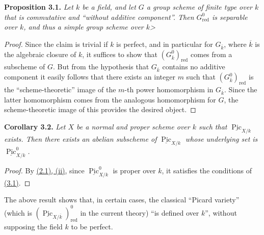 \documentclass{article}
\newenvironment{itenv}[1]
  {\phantomsection\par\smallskip\noindent\textbf{#1.}\itshape}
  {\par\smallskip}
\newcommand{\oldpage}[1]{\marginpar{\footnotesize$\Big\vert$ \textit{p.~#1}}}
\theoremstyle{definition}
\theoremstyle{definition}
\theoremstyle{definition}
\theoremstyle{definition}
\theoremstyle{remark}
\begin{document}
\leavevmode{}%
\begin{itenv}{Proposition 3.1}
Let \(k\) be a field, and let \(G\) a group scheme of finite type over \(k\) that is commutative and ``without additive component''.
Then \(G_\mathrm{red}^0\) is separable over \(k\), and thus a simple group scheme over \(k\)\textgreater{}

\end{itenv}

\begin{proof}
Since the claim is trivial if \(k\) is perfect, and in particular for \(G_{\overline{k}}\), where \(\overline{k}\) is the algebraic closure of \(k\), it suffices to show that \((G_{\overline{k}}^0)_\mathrm{red}\) comes from a subscheme of \(G\).
But from the hypothesis that \(G_{\overline{k}}\) contains no additive component it easily follows that there exists an integer \(m\) such that \((G_{\overline{k}}^0)_\mathrm{red}\) is the ``scheme-theoretic'' image of the \(m\)-th power homomorphism in \(G_{\overline{k}}\).
Since the latter homomorphism comes from the analogous homomorphism for \(G\), the scheme-theoretic image of this provides the desired object.
\end{proof}

\leavevmode{}%
\begin{itenv}{Corollary 3.2}
Let \(X\) be a normal and proper scheme over \(k\) such that \(\underline{\operatorname{Pic}}_{X/k}\) exists.
Then there exists an abelian subscheme of \(\underline{\operatorname{Pic}}_{X/k}\) whose underlying set is \(\underline{\operatorname{Pic}}_{X/k}^0\).

\end{itenv}

\begin{proof}
By \protect\hyperlink{fga-3-vi-theorem-2.1}{(2.1), (ii)}, since \(\underline{\operatorname{Pic}}_{X/k}^0\) is proper over \(k\), it satisfies the conditions of \protect\hyperlink{fga-3-vi-proposition-3.1}{(3.1)}.
\end{proof}

\oldpage{236-17}The above result shows that, in certain cases, the classical ``Picard variety'' (which is \((\underline{\operatorname{Pic}}_{X/\overline{k}})_\mathrm{red}^0\) in the current theory) ``is defined over \(k\)'', without supposing the field \(k\) to be perfect.
\end{document}
